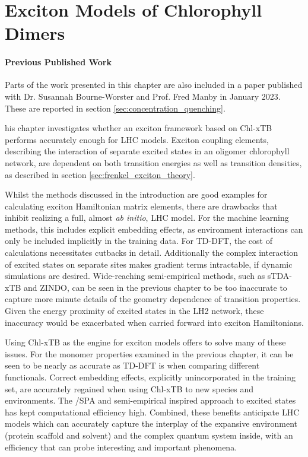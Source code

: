 %
%
\let\textcircled=\pgftextcircled
\chapter{Exciton Models of Chlorophyll Dimers}
\label{chap:excitons}

\subsubsection*{Previous Published Work}
Parts of the work presented in this chapter are also included in a paper published 
with Dr. Susannah Bourne-Worster and Prof. Fred Manby in January 2023. These are 
reported in section \ref{sec:concentration_quenching}.

his chapter investigates whether an exciton framework based on Chl-xTB
performs accurately enough for LHC models. Exciton coupling elements, describing the
interaction of separate excited states in an oligomer chlorophyll network, are dependent
on both transition energies as well as transition densities, as described in section
\ref{sec:frenkel_exciton_theory}.

Whilst the methods discussed in the introduction are good examples for calculating exciton
Hamiltonian matrix elements, there are drawbacks that inhibit realizing a full,
almost \emph{ab initio}, LHC model. For the machine learning methods, this includes
explicit embedding effects, as environment interactions can only be included implicitly
in the training data. For TD-DFT, the cost of calculations necessitates cutbacks
in detail. Additionally the complex interaction of excited states on separate sites
makes gradient terms intractable, \cite{Stross2016} if dynamic simulations are desired.
Wide-reaching semi-empirical methods, such as sTDA-xTB and ZINDO, can be seen in
the previous chapter to be too inaccurate to capture more minute details of the 
geometry dependence of \Qy transition properties. Given the energy proximity of 
excited states in the LH2 network, these inaccuracy would be exacerbated when carried
forward into exciton Hamiltonians.

Using Chl-xTB as the engine for exciton models offers to solve many of these issues.
For the monomer properties examined in the previous chapter, it can be seen to be
nearly as accurate as TD-DFT is when comparing different functionals. Correct embedding 
effects, explicitly unincorporated in the training set, are accurately regained
when using Chl-xTB to new species and environments. The \dscf/SPA and semi-empirical 
inspired approach to excited states has kept computational efficiency high. Combined,
these benefits anticipate LHC models which can accurately capture the interplay
of the expansive environment (protein scaffold and solvent) and the complex quantum
system inside, with an efficiency that can probe interesting and important phenomena.

